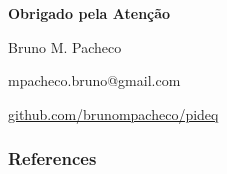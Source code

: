 \documentclass[t]{beamer}
\begin{document}
{
\begin{frame}
\vspace{15mm}
\begin{center}
\textcolor{cinza}{
\textbf{Obrigado pela Atenção}
}
\end{center}
\vspace{-6mm}
\begin{center}
\textcolor{cinza}{\scriptsize{
	Bruno M. Pacheco
}}
\end{center}
\vspace{-6mm}
\begin{center}
\textcolor{cinza}{\scriptsize{
mpacheco.bruno@gmail.com
}}
\end{center}
\vspace{-6mm}
\begin{center}
\textcolor{cinza}{\scriptsize{
\href{https://github.com/brunompacheco/pideq}{github.com/brunompacheco/pideq}
}}
\end{center}
\end{frame}
}

\begin{frame}
    \frametitle{References}
\end{frame}
\end{document}
